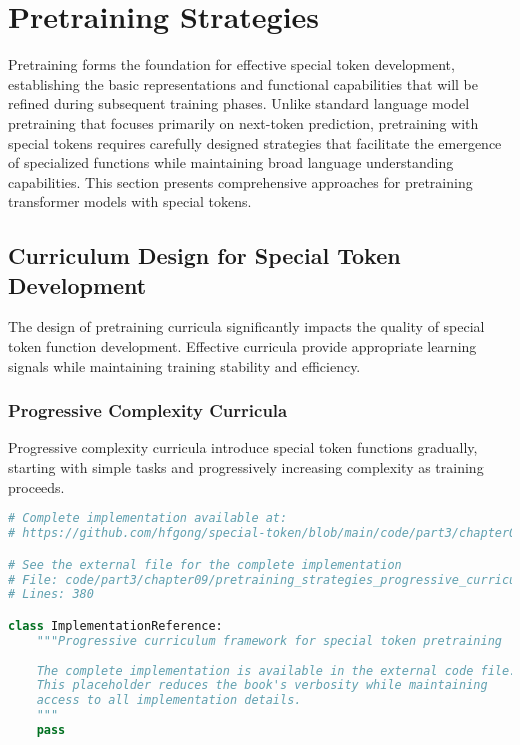 
\section{Pretraining Strategies}

Pretraining forms the foundation for effective special token development, establishing the basic representations and functional capabilities that will be refined during subsequent training phases. Unlike standard language model pretraining that focuses primarily on next-token prediction, pretraining with special tokens requires carefully designed strategies that facilitate the emergence of specialized functions while maintaining broad language understanding capabilities. This section presents comprehensive approaches for pretraining transformer models with special tokens.

\subsection{Curriculum Design for Special Token Development}

The design of pretraining curricula significantly impacts the quality of special token function development. Effective curricula provide appropriate learning signals while maintaining training stability and efficiency.

\subsubsection{Progressive Complexity Curricula}

Progressive complexity curricula introduce special token functions gradually, starting with simple tasks and progressively increasing complexity as training proceeds.

\begin{lstlisting}[language=Python, caption={Progressive curriculum framework for special token pretraining}]
# Complete implementation available at:
# https://github.com/hfgong/special-token/blob/main/code/part3/chapter09/pretraining_strategies_progressive_curriculum_framewo.py

# See the external file for the complete implementation
# File: code/part3/chapter09/pretraining_strategies_progressive_curriculum_framewo.py
# Lines: 380

class ImplementationReference:
    """Progressive curriculum framework for special token pretraining
    
    The complete implementation is available in the external code file.
    This placeholder reduces the book's verbosity while maintaining
    access to all implementation details.
    """
    pass
\end{lstlisting}


